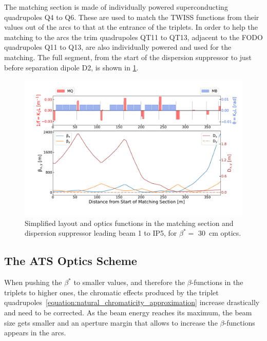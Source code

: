 The matching section is made of individually powered superconducting quadrupoles Q\num{4} to Q\num{6}.
These are used to match the TWISS functions from their values out of the arcs to that at the entrance of the triplets.
In order to help the matching to the arcs the trim quadrupoles QT\num{11} to QT\num{13}, adjacent to the FODO quadrupoles Q\num{11} to Q\num{13}, are also individually powered and used for the matching.
The full segment, from the start of the dispersion suppressor to just before separation dipole D\num{2}, is shown in \cref{figure:lhc_matching_section}.

\begin{figure}[!hbt]
  \centering
  \includegraphics*[width=0.99\linewidth]{Figures/Optics_Measurements_Corrections_at_LHC/lhc_matching_section.pdf}
  \caption{Simplified layout and optics functions in the matching section and dispersion suppressor leading beam \num{1} to IP\num{5}, for \(\beta^{\ast} =\) \qty{30}{\centi\meter} optics.}
  \label{figure:lhc_matching_section}
\end{figure}

\subsection{The ATS Optics Scheme}
\label{subsection:lhc_ats_optics_scheme}

When pushing the \(\beta^{\ast}\) to smaller values, and therefore the \(\beta\)-functions in the triplets to higher ones, the chromatic effects produced by the triplet quadrupoles~\cref{equation:natural_chromaticity_approximation} increase drastically and need to be corrected.
As the beam energy reaches its maximum, the beam size gets smaller and an aperture margin that allows to increase the \(\beta\)-functions appears in the arcs.

